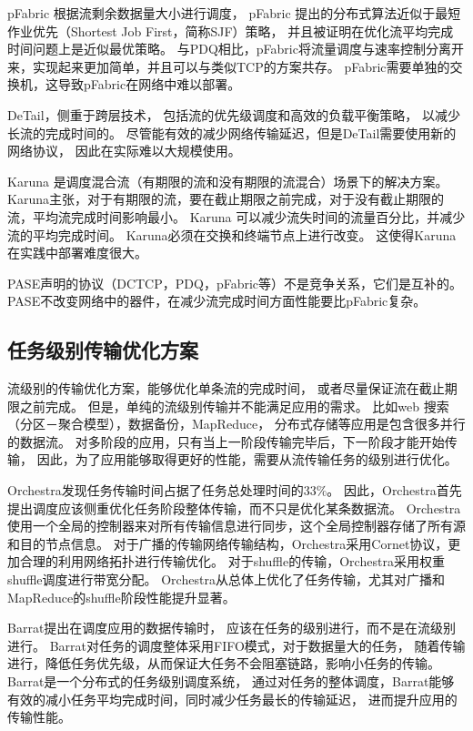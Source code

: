 pFabric \cite{pFabric}根据流剩余数据量大小进行调度，
pFabric \cite{pFabric}提出的分布式算法近似于最短作业优先（Shortest Job First，简称SJF）策略，
并且被证明在优化流平均完成时间问题上是近似最优策略。
与PDQ相比，pFabric将流量调度与速率控制分离开来，实现起来更加简单，并且可以与类似TCP的方案共存。
pFabric需要单独的交换机，这导致pFabric在网络中难以部署。
 
 
DeTail\cite{DeTail}，侧重于跨层技术，
包括流的优先级调度和高效的负载平衡策略，
以减少长流的完成时间的。
尽管能有效的减少网络传输延迟，但是DeTail需要使用新的网络协议，
因此在实际难以大规模使用。


Karuna \cite{chen2016scheduling} 是调度混合流（有期限的流和没有期限的流混合）场景下的解决方案。
Karuna主张，对于有期限的流，要在截止期限之前完成，对于没有截止期限的流，平均流完成时间影响最小。
Karuna \cite{chen2016scheduling} 可以减少流失时间的流量百分比，并减少流的平均完成时间。 
Karuna必须在交换和终端节点上进行改变。
这使得Karuna在实践中部署难度很大。

PASE\cite{PASE}声明的协议（DCTCP，PDQ，pFabric等）不是竞争关系，它们是互补的。
PASE不改变网络中的器件，在减少流完成时间方面性能要比pFabric复杂。
 
\subsection{任务级别传输优化方案}
流级别的传输优化方案，能够优化单条流的完成时间，
或者尽量保证流在截止期限之前完成。
但是，单纯的流级别传输并不能满足应用的需求。
比如web 搜索（分区－聚合模型），数据备份，MapReduce，
分布式存储等应用是包含很多并行的数据流。
对多阶段的应用，只有当上一阶段传输完毕后，下一阶段才能开始传输，
因此，为了应用能够取得更好的性能，需要从流传输任务的级别进行优化。

Orchestra\cite{Chowdhury2011Managing}发现任务传输时间占据了任务总处理时间的33$\%$\cite{Chowdhury2011Managing}。
因此，Orchestra首先提出调度应该侧重优化任务阶段整体传输，而不只是优化某条数据流。
Orchestra使用一个全局的控制器来对所有传输信息进行同步，这个全局控制器存储了所有源和目的节点信息。
对于广播的传输网络传输结构，Orchestra采用Cornet协议，更加合理的利用网络拓扑进行传输优化。
对于shuffle的传输，Orchestra采用权重shuffle调度进行带宽分配。
Orchestra从总体上优化了任务传输，尤其对广播和MapReduce的shuffle阶段性能提升显著。

Barrat\cite{dogar2014decentralized}提出在调度应用的数据传输时，
应该在任务的级别进行，而不是在流级别进行。
Barrat对任务的调度整体采用FIFO模式，对于数据量大的任务，
随着传输进行，降低任务优先级，从而保证大任务不会阻塞链路，影响小任务的传输。
Barrat是一个分布式的任务级别调度系统，
通过对任务的整体调度，Barrat能够有效的减小任务平均完成时间，同时减少任务最长的传输延迟，
进而提升应用的传输性能。


